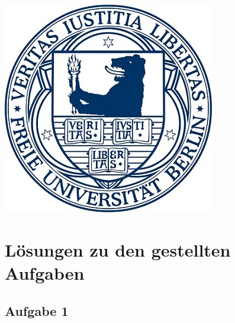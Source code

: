 \documentclass{llncs}
\begin{document}
\maketitle

\begin{center}
\includegraphics{fubsiegel.jpg}
\end{center}

\chapter*{L\"osungen zu den gestellten Aufgaben}

\section*{Aufgabe 1}
\end{document}
